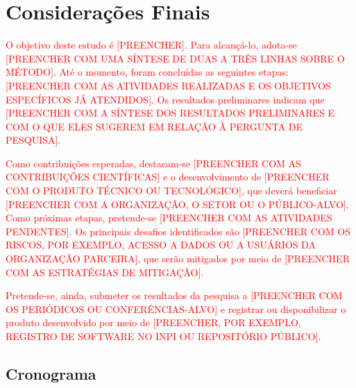 \section{Considerações Finais}
\label{sec:conclusao}



\textcolor{red}{O objetivo deste estudo é [PREENCHER]. Para alcançá-lo, adota-se [PREENCHER COM UMA SÍNTESE DE DUAS A TRÊS LINHAS SOBRE O MÉTODO]. Até o momento, foram concluídas as seguintes etapas: [PREENCHER COM AS ATIVIDADES REALIZADAS E OS OBJETIVOS ESPECÍFICOS JÁ ATENDIDOS]. Os resultados preliminares indicam que [PREENCHER COM A SÍNTESE DOS RESULTADOS PRELIMINARES E COM O QUE ELES SUGEREM EM RELAÇÃO À PERGUNTA DE PESQUISA].}

\textcolor{red}{Como contribuições esperadas, destacam-se [PREENCHER COM AS CONTRIBUIÇÕES CIENTÍFICAS] e o desenvolvimento de [PREENCHER COM O PRODUTO TÉCNICO OU TECNOLÓGICO], que deverá beneficiar [PREENCHER COM A ORGANIZAÇÃO, O SETOR OU O PÚBLICO-ALVO]. Como próximas etapas, pretende-se [PREENCHER COM AS ATIVIDADES PENDENTES]. Os principais desafios identificados são [PREENCHER COM OS RISCOS, POR EXEMPLO, ACESSO A DADOS OU A USUÁRIOS DA ORGANIZAÇÃO PARCEIRA], que serão mitigados por meio de [PREENCHER COM AS ESTRATÉGIAS DE MITIGAÇÃO].}

\textcolor{red}{Pretende-se, ainda, submeter os resultados da pesquisa a [PREENCHER COM OS PERIÓDICOS OU CONFERÊNCIAS-ALVO] e registrar ou disponibilizar o produto desenvolvido por meio de [PREENCHER, POR EXEMPLO, REGISTRO DE SOFTWARE NO INPI OU REPOSITÓRIO PÚBLICO].}


\subsection{Cronograma}
\label{sub:cronograma}

